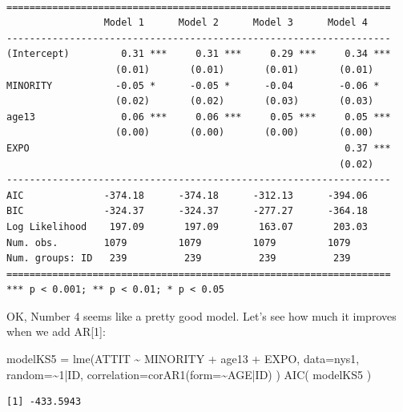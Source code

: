 \documentclass[
  letterpaper,
  DIV=11,
  numbers=noendperiod]{scrreprt}
\newenvironment{Shaded}{}{}
\newcommand{\AttributeTok}[1]{\textcolor[rgb]{0.49,0.56,0.16}{#1}}
\newcommand{\DecValTok}[1]{\textcolor[rgb]{0.25,0.63,0.44}{#1}}
\newcommand{\FunctionTok}[1]{\textcolor[rgb]{0.02,0.16,0.49}{#1}}
\newcommand{\NormalTok}[1]{#1}
\newcommand{\OtherTok}[1]{\textcolor[rgb]{0.00,0.44,0.13}{#1}}
\newcommand{\SpecialCharTok}[1]{\textcolor[rgb]{0.25,0.44,0.63}{#1}}
\begin{document}
\begin{verbatim}

===================================================================
                 Model 1      Model 2      Model 3      Model 4    
-------------------------------------------------------------------
(Intercept)         0.31 ***     0.31 ***     0.29 ***     0.34 ***
                   (0.01)       (0.01)       (0.01)       (0.01)   
MINORITY           -0.05 *      -0.05 *      -0.04        -0.06 *  
                   (0.02)       (0.02)       (0.03)       (0.03)   
age13               0.06 ***     0.06 ***     0.05 ***     0.05 ***
                   (0.00)       (0.00)       (0.00)       (0.00)   
EXPO                                                       0.37 ***
                                                          (0.02)   
-------------------------------------------------------------------
AIC              -374.18      -374.18      -312.13      -394.06    
BIC              -324.37      -324.37      -277.27      -364.18    
Log Likelihood    197.09       197.09       163.07       203.03    
Num. obs.        1079         1079         1079         1079       
Num. groups: ID   239          239          239          239       
===================================================================
*** p < 0.001; ** p < 0.01; * p < 0.05
\end{verbatim}

OK, Number 4 seems like a pretty good model. Let's see how much it
improves when we add AR{[}1{]}:

\begin{Shaded}
\begin{Highlighting}[]
\NormalTok{modelKS5 }\OtherTok{=} \FunctionTok{lme}\NormalTok{(ATTIT }\SpecialCharTok{\textasciitilde{}}\NormalTok{ MINORITY }\SpecialCharTok{+}\NormalTok{ age13 }\SpecialCharTok{+}\NormalTok{ EXPO, }
              \AttributeTok{data=}\NormalTok{nys1,}
              \AttributeTok{random=}\SpecialCharTok{\textasciitilde{}}\DecValTok{1}\SpecialCharTok{|}\NormalTok{ID,}
              \AttributeTok{correlation=}\FunctionTok{corAR1}\NormalTok{(}\AttributeTok{form=}\SpecialCharTok{\textasciitilde{}}\NormalTok{AGE}\SpecialCharTok{|}\NormalTok{ID) )}
\FunctionTok{AIC}\NormalTok{( modelKS5 )}
\end{Highlighting}
\end{Shaded}

\begin{verbatim}
[1] -433.5943
\end{verbatim}
\end{document}
